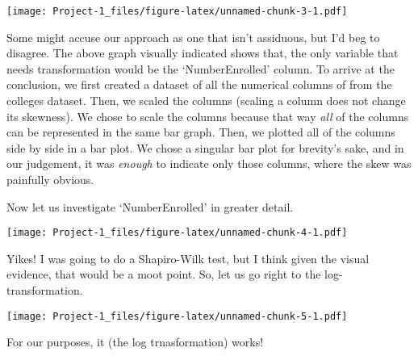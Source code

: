 \documentclass[
]{article}
\newenvironment{Shaded}{\begin{snugshade}}{\end{snugshade}}
\newcommand{\AttributeTok}[1]{\textcolor[rgb]{0.77,0.63,0.00}{#1}}
\newcommand{\FunctionTok}[1]{\textcolor[rgb]{0.00,0.00,0.00}{#1}}
\newcommand{\NormalTok}[1]{#1}
\newcommand{\OtherTok}[1]{\textcolor[rgb]{0.56,0.35,0.01}{#1}}
\newcommand{\SpecialCharTok}[1]{\textcolor[rgb]{0.00,0.00,0.00}{#1}}
\begin{document}
\begin{Shaded}
\end{Shaded}

\texttt{[image: Project-1\_files/figure-latex/unnamed-chunk-3-1.pdf]}

Some might accuse our approach as one that isn't assiduous, but I'd beg
to disagree. The above graph visually indicated shows that, the only
variable that needs transformation would be the `NumberEnrolled' column.
To arrive at the conclusion, we first created a dataset of all the
numerical columns of from the colleges dataset. Then, we scaled the
columns (scaling a column does not change its skewness). We chose to
scale the columns because that way \emph{all} of the columns can be
represented in the same bar graph. Then, we plotted all of the columns
side by side in a bar plot. We chose a singular bar plot for brevity's
sake, and in our judgement, it was \emph{enough} to indicate only those
columns, where the skew was painfully obvious.

Now let us investigate `NumberEnrolled' in greater detail.

\begin{Shaded}
\end{Shaded}

\texttt{[image: Project-1\_files/figure-latex/unnamed-chunk-4-1.pdf]}

Yikes! I was going to do a Shapiro-Wilk test, but I think given the
visual evidence, that would be a moot point. So, let us go right to the
log-transformation.

\begin{Shaded}
\end{Shaded}

\texttt{[image: Project-1\_files/figure-latex/unnamed-chunk-5-1.pdf]}

For our purposes, it (the log trnasformation) works!
\end{document}
